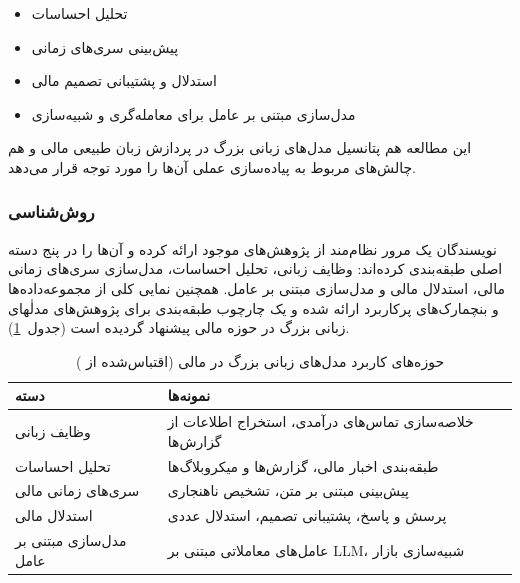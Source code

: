 \documentclass[12pt, a4paper]{report}
\begin{document}
\begin{itemize}
    \item تحلیل احساسات
    \item پیش‌بینی سری‌های زمانی
    \item استدلال و پشتیبانی تصمیم مالی
    \item مدل‌سازی مبتنی بر عامل برای معامله‌گری و شبیه‌سازی
\end{itemize}
این مطالعه هم پتانسیل مدل‌‌های زبانی بزرگ در پردازش زبان طبیعی مالی و هم چالش‌های مربوط به پیاده‌سازی عملی آن‌ها را مورد توجه قرار می‌دهد.

\subsubsection{روش‌شناسی}
نویسندگان یک مرور نظام‌مند از پژوهش‌های موجود ارائه کرده و آن‌ها را در پنج دسته اصلی طبقه‌بندی کرده‌اند: وظایف زبانی، تحلیل احساسات، مدل‌سازی سری‌های زمانی مالی، استدلال مالی و مدل‌سازی مبتنی بر عامل. همچنین نمایی کلی از مجموعه‌داده‌ها و بنچمارک‌های پرکاربرد ارائه شده و یک چارچوب طبقه‌بندی برای پژوهش‌های مدلٰهای زبانی بزرگ در حوزه مالی پیشنهاد گردیده است (جدول~\ref{tab:finance-llm-taxonomy}).  

\begin{table}[h]
\centering
\caption{حوزه‌های کاربرد مدل‌های زبانی بزرگ در مالی (اقتباس‌شده از \cite{nie2024survey})}
\begin{tabular}{p{3.5cm} p{9cm}}
\hline
\textbf{دسته} & \textbf{نمونه‌ها} \\
\hline
وظایف زبانی & خلاصه‌سازی تماس‌های درآمدی، استخراج اطلاعات از گزارش‌ها \\
تحلیل احساسات & طبقه‌بندی اخبار مالی، گزارش‌ها و میکروبلاگ‌ها \\
سری‌های زمانی مالی & پیش‌بینی مبتنی بر متن، تشخیص ناهنجاری \\
استدلال مالی & پرسش و پاسخ، پشتیبانی تصمیم، استدلال عددی \\
مدل‌سازی مبتنی بر عامل & عامل‌های معاملاتی مبتنی بر LLM، شبیه‌سازی بازار \\
\hline
\end{tabular}
\label{tab:finance-llm-taxonomy}
\end{table}
\end{document}
